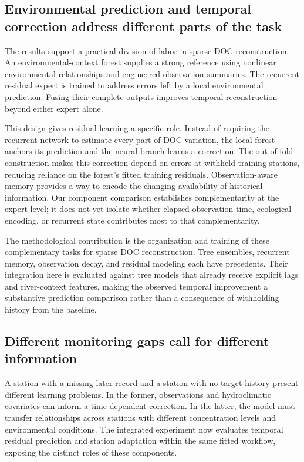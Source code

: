 \documentclass[11pt]{article}
\begin{document}
\subsection{Environmental prediction and temporal correction address different parts of the task}
The results support a practical division of labor in sparse DOC reconstruction. An environmental-context forest supplies a strong reference using nonlinear environmental relationships and engineered observation summaries. The recurrent residual expert is trained to address errors left by a local environmental prediction. Fusing their complete outputs improves temporal reconstruction beyond either expert alone.

This design gives residual learning a specific role. Instead of requiring the recurrent network to estimate every part of DOC variation, the local forest anchors its prediction and the neural branch learns a correction. The out-of-fold construction makes this correction depend on errors at withheld training stations, reducing reliance on the forest's fitted training residuals. Observation-aware memory provides a way to encode the changing availability of historical information. Our component comparison establishes complementarity at the expert level; it does not yet isolate whether elapsed observation time, ecological encoding, or recurrent state contributes most to that complementarity.

The methodological contribution is the organization and training of these complementary tasks for sparse DOC reconstruction. Tree ensembles, recurrent memory, observation decay, and residual modeling each have precedents. Their integration here is evaluated against tree models that already receive explicit lags and river-context features, making the observed temporal improvement a substantive prediction comparison rather than a consequence of withholding history from the baseline.

\subsection{Different monitoring gaps call for different information}
A station with a missing later record and a station with no target history present different learning problems. In the former, observations and hydroclimatic covariates can inform a time-dependent correction. In the latter, the model must transfer relationships across stations with different concentration levels and environmental conditions. The integrated experiment now evaluates temporal residual prediction and station adaptation within the same fitted workflow, exposing the distinct roles of these components.
\end{document}
